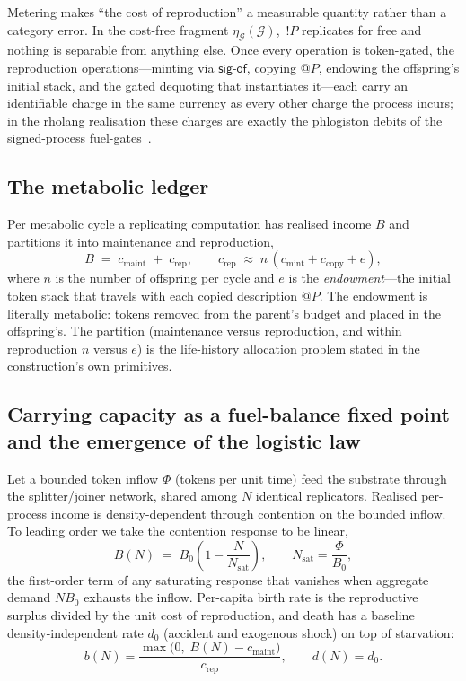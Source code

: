 \documentclass[11pt]{article}
\makeatletter
\theoremstyle{plain}
\theoremstyle{definition}
\theoremstyle{remark}
\newcommand{\G}{\mathcal{G}}
\newcommand{\sigof}{\mathsf{sig\text{-}of}}
\newcommand{\quo}[1]{@#1}
\newcommand{\cmaint}{c_{\mathrm{maint}}}
\newcommand{\crep}{c_{\mathrm{rep}}}
\newcommand{\cmint}{c_{\mathrm{mint}}}
\newcommand{\ccopy}{c_{\mathrm{copy}}}
\newcommand{\unit}{\eta}
\makeatother
\begin{document}
Metering makes ``the cost of reproduction'' a measurable quantity rather than a
category error. In the cost-free fragment $\unit_\G(\G)$, $\,!P$ replicates for
free and nothing is
separable from anything else. Once every operation is token-gated, the
reproduction operations---minting via $\sigof$, copying $\quo P$, endowing the
offspring's initial stack, and the gated dequoting that instantiates it---each
carry an identifiable charge in the same currency as every other charge the
process incurs; in the rholang realisation these charges are exactly the
phlogiston debits of the signed-process fuel-gates~\cite{noteI}.

\subsection{The metabolic ledger}

Per metabolic cycle a replicating computation has realised income $B$ and
partitions it into maintenance and reproduction,
\[
  B \;=\; \cmaint \;+\; \crep,
  \qquad
  \crep \;\approx\; n\,(\cmint + \ccopy + e),
\]
where $n$ is the number of offspring per cycle and $e$ is the
\emph{endowment}---the initial token stack that travels with each copied
description $\quo P$. The endowment is literally metabolic: tokens removed from
the parent's budget and placed in the offspring's. The partition (maintenance
versus reproduction, and within reproduction $n$ versus $e$) is the life-history
allocation problem stated in the construction's own primitives.

\subsection{Carrying capacity as a fuel-balance fixed point and the emergence of the logistic law}

Let a bounded token inflow $\Phi$ (tokens per unit time) feed the substrate
through the splitter/joiner network, shared among $N$ identical replicators.
Realised per-process income is density-dependent through contention on the
bounded inflow. To leading order we take the contention response to be linear,
\begin{equation}
  B(N) \;=\; B_0\!\left(1 - \frac{N}{N_{\mathrm{sat}}}\right),
  \qquad
  N_{\mathrm{sat}} = \frac{\Phi}{B_0},
  \label{eq:contention}
\end{equation}
the first-order term of any saturating response that vanishes when aggregate
demand $N B_0$ exhausts the inflow. Per-capita birth rate is the reproductive
surplus divided by the unit cost of reproduction, and death has a baseline
density-independent rate $d_0$ (accident and exogenous shock) on top of
starvation:
\begin{equation}
  b(N) = \frac{\max\!\big(0,\; B(N)-\cmaint\big)}{\crep},
  \qquad d(N) = d_0 .
  \label{eq:rates}
\end{equation}
\end{document}
